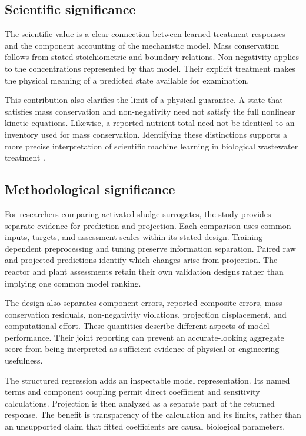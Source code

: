 \subsection{Scientific significance}

The scientific value is a clear connection between learned treatment responses and the component accounting of the mechanistic model. Mass conservation follows from stated stoichiometric and boundary relations. Non-negativity applies to the concentrations represented by that model. Their explicit treatment makes the physical meaning of a predicted state available for examination.

This contribution also clarifies the limit of a physical guarantee. A state that satisfies mass conservation and non-negativity need not satisfy the full nonlinear kinetic equations. Likewise, a reported nutrient total need not be identical to an inventory used for mass conservation. Identifying these distinctions supports a more precise interpretation of scientific machine learning in biological wastewater treatment \citep{Henze2006,TakacsVanrolleghem2006}.

\subsection{Methodological significance}

For researchers comparing activated sludge surrogates, the study provides separate evidence for prediction and projection. Each comparison uses common inputs, targets, and assessment scales within its stated design. Training-dependent preprocessing and tuning preserve information separation. Paired raw and projected predictions identify which changes arise from projection. The reactor and plant assessments retain their own validation designs rather than implying one common model ranking.

The design also separates component errors, reported-composite errors, mass conservation residuals, non-negativity violations, projection displacement, and computational effort. These quantities describe different aspects of model performance. Their joint reporting can prevent an accurate-looking aggregate score from being interpreted as sufficient evidence of physical or engineering usefulness.

The structured regression adds an inspectable model representation. Its named terms and component coupling permit direct coefficient and sensitivity calculations. Projection is then analyzed as a separate part of the returned response. The benefit is transparency of the calculation and its limits, rather than an unsupported claim that fitted coefficients are causal biological parameters.


